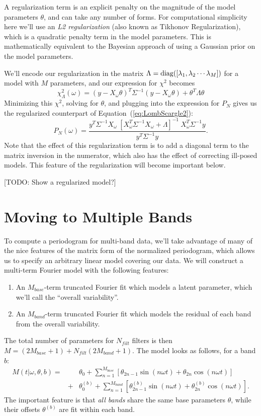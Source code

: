 \documentclass[12pt,preprint]{aastex}
\newcommand{\todo}[1]{{\color{red} [TODO: #1]}}
\newcommand{\Eq}[1]{Equation~(\ref{eq:#1})}
\newcommand{\eq}[1]{\Eq{#1}}
\newcommand{\eqlabel}[1]{\label{eq:#1}}
\begin{document}
A regularization term is an explicit penalty on the magnitude of the model parameters $\theta$, and can take any number of forms. For computational simplicity here we'll use an {\it L2 regularization} (also known as Tikhonov Regularization), which is a quadratic penalty term in the model parameters. This is mathematically equivalent to the Bayesian approach of using a Gaussian prior on the model parameters.

We'll encode our regularization in the matrix $\Lambda = {\rm diag}([\lambda_1, \lambda_2 \cdots \lambda_M])$ for a model with $M$ parameters, and our expression for $\chi^2$ becomes
\begin{equation}
  \eqlabel{chi2reg}
  \chi_\Lambda^2(\omega) = (y - X_\omega\theta)^T\Sigma^{-1}(y - X_\omega\theta) + \theta^T\Lambda\theta
\end{equation}
Minimizing this $\chi^2$, solving for $\theta$, and plugging into the expression for $P_N$ gives us the regularized counterpart of \eq{LombScargle2}:
\begin{equation}
  \eqlabel{LombScargleReg}
  P_N(\omega) = \frac{y^T\Sigma^{-1}X_\omega~[X_\omega^T\Sigma^{-1}X_\omega + \Lambda]^{-1}~X_\omega^T\Sigma^{-1}y}{y^T\Sigma^{-1}y}.
\end{equation}
Note that the effect of this regularization term is to add a diagonal term to the matrix inversion in the numerator, which also has the effect of correcting ill-posed models. This feature of the regularization will become important below.

\todo{Show a regularized model?}

\section{Moving to Multiple Bands}

To compute a periodogram for multi-band data, we'll take advantage of many of the nice features of the matrix form of the normalized periodogram, which allows us to specify an arbitrary linear model covering our data. We will construct a multi-term Fourier model with the following features:
\begin{enumerate}
  \item An $M_{base}$-term truncated Fourier fit which models a latent parameter, which we'll call the ``overall variability''.
  \item An $M_{band}$-term truncated Fourier fit which models the residual of each band from the overall variability.
\end{enumerate}
The total number of parameters for $N_{filt}$ filters is then $M = (2M_{base} + 1) + N_{filt}(2M_{band} + 1)$. The model looks as follows, for a band $b$:
\begin{eqnarray}
  M(t|\omega,\theta,b) = &&\theta_0 + \sum_{n=1}^{M_{base}} \left[\theta_{2n - 1}\sin(n\omega t) + \theta_{2n}\cos(n\omega t)\right]\\ 
  &+& \theta^{(b)}_0 + \sum_{n=1}^{M_{band}} \left[\theta^{(b)}_{2n - 1}\sin(n\omega t) + \theta^{(b)}_{2n}\cos(n\omega t)\right].
\end{eqnarray}
The important feature is that {\it all bands} share the same base parameters $\theta$, while their offsets $\theta^{(b)}$ are fit within each band.
\end{document}
